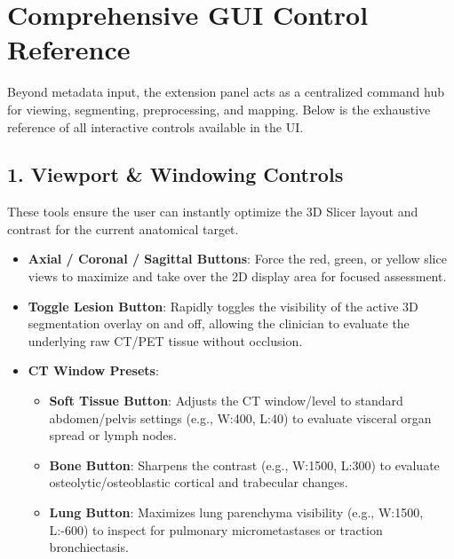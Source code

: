 \documentclass[a4paper,10pt]{article}
\begin{document}
\section{Comprehensive GUI Control Reference}
Beyond metadata input, the extension panel acts as a centralized command hub for viewing, segmenting, preprocessing, and mapping. Below is the exhaustive reference of all interactive controls available in the UI.

\subsection{1. Viewport \& Windowing Controls}
These tools ensure the user can instantly optimize the 3D Slicer layout and contrast for the current anatomical target.
\begin{itemize}
    \item \textbf{Axial / Coronal / Sagittal Buttons}: Force the red, green, or yellow slice views to maximize and take over the 2D display area for focused assessment.
    \item \textbf{Toggle Lesion Button}: Rapidly toggles the visibility of the active 3D segmentation overlay on and off, allowing the clinician to evaluate the underlying raw CT/PET tissue without occlusion.
    \item \textbf{CT Window Presets}:
    \begin{itemize}
        \item \textbf{Soft Tissue Button}: Adjusts the CT window/level to standard abdomen/pelvis settings (e.g., W:400, L:40) to evaluate visceral organ spread or lymph nodes.
        \item \textbf{Bone Button}: Sharpens the contrast (e.g., W:1500, L:300) to evaluate osteolytic/osteoblastic cortical and trabecular changes.
        \item \textbf{Lung Button}: Maximizes lung parenchyma visibility (e.g., W:1500, L:-600) to inspect for pulmonary micrometastases or traction bronchiectasis.
    \end{itemize}
\end{itemize}
\end{document}
